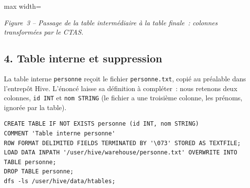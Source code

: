 \begin{center}
\begin{adjustbox}{max width=\linewidth}
\end{adjustbox}\par\nobreak\smallskip
\small\textit{Figure~3 -- Passage de la table intermédiaire à la table finale~: colonnes transformées par le CTAS.}
\end{center}

\subsection*{4. Table interne et suppression}
{}

\noindent La table interne \texttt{personne} reçoit le fichier \texttt{personne.txt}, copié au préalable dans l'entrepôt Hive. L'énoncé laisse sa définition à compléter~: nous retenons deux colonnes, \texttt{id INT} et \texttt{nom STRING} (le fichier a une troisième colonne, les prénoms, ignorée par la table).

\begin{verbatim}
CREATE TABLE IF NOT EXISTS personne (id INT, nom STRING)
COMMENT 'Table interne personne'
ROW FORMAT DELIMITED FIELDS TERMINATED BY '\073' STORED AS TEXTFILE;
LOAD DATA INPATH '/user/hive/warehouse/personne.txt' OVERWRITE INTO TABLE personne;
DROP TABLE personne;
dfs -ls /user/hive/data/htables;
\end{verbatim}

